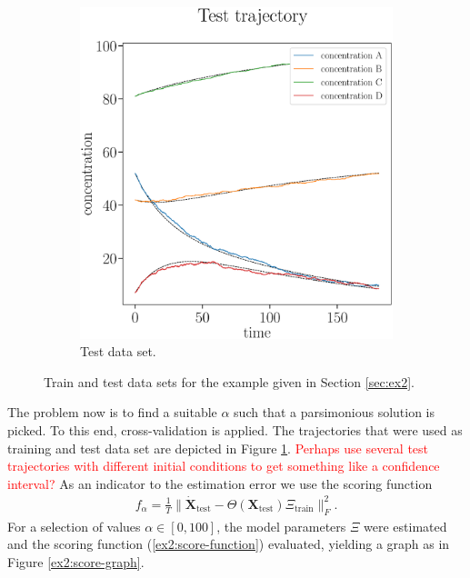\documentclass[oneside, abstracton, titlepage]{scrartcl}
\begin{document}
\begin{figure}
\begin{subfigure}[b]{.45\textwidth}
			\includegraphics[width=\textwidth]{./figures_tex/cv_concentrations_test}
			\caption{Test data set.}
		\end{subfigure}
		\caption{Train and test data sets for the example given in Section \ref{sec:ex2}.}
		\label{ex2:test-train-concentration-curves}
	\end{figure}
	
	The problem now is to find a suitable $\alpha$ such that a parsimonious solution is picked. To this end, cross-validation is applied. The trajectories that were used as training and test data set are depicted in Figure \ref{ex2:test-train-concentration-curves}. \textcolor{red}{Perhaps use several test trajectories with different initial conditions to get something like a confidence interval?} As an indicator to the estimation error we use the scoring function
	\begin{align}
		f_\alpha = \frac{1}{T}\|\mathbf{\dot{X}}_\text{test} - \Theta (\textbf{X}_\text{test}) \Xi_\text{train}\|_F^2.
		\label{ex2:score-function}
	\end{align}
	For a selection of values $\alpha\in [0, 100]$, the model parameters $\Xi$ were estimated and the scoring function (\ref{ex2:score-function}) evaluated, yielding a graph as in Figure \ref{ex2:score-graph}.
	
\end{document}
